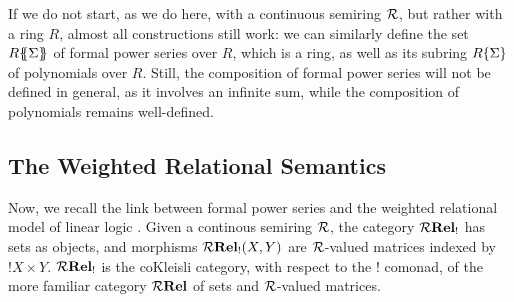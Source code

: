 


If we do not start, as we do here, with a continuous semiring $\mathcal{R}$, but rather with a ring $R$, almost all constructions still work: we can similarly define the set ${R}\{\!\!\{\Sigma\}\!\!\}$ of formal power series over $R$, which is a ring, as well as its subring  ${R}\{\Sigma\}$ of polynomials over $R$. Still, the composition of formal power series will not be defined in general, as it involves an infinite sum, while the composition of polynomials remains well-defined.
  
  
  \subsection{The Weighted Relational Semantics}
  
    Now, we recall the link between formal power series and the weighted relational model of linear logic \cite{DBLP:conf/lics/LairdMMP13}. Given a continous semiring $\mathcal{R}$, the category 
     $\mathcal{R}\mathbf{Rel_!}$ has sets as objects, and morphisms $\mathcal{R}\mathbf{Rel_!}(X, Y)$ are $\mathcal{R}$-valued matrices indexed by $!X \times Y$. 
     $\mathcal{R}\mathbf{Rel_!}$ is the coKleisli category, with respect to the $!$ comonad, of the more familiar category  $\mathcal{R}\mathbf{Rel}$ of sets and $\mathcal{R}$-valued matrices. 
    

